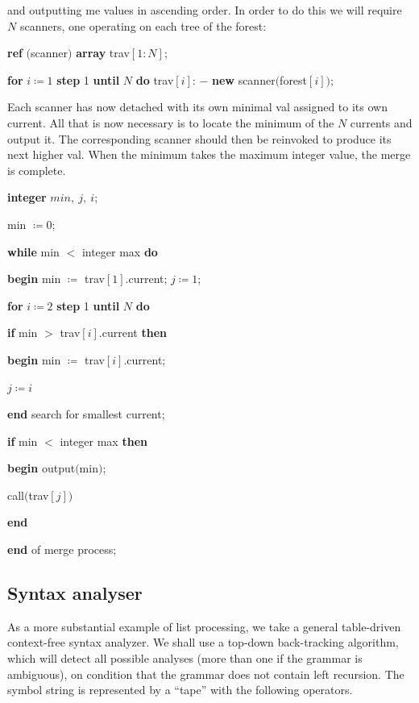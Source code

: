 \documentclass[twoside,11pt]{book}
\begin{document}
\noindent
and outputting me values in ascending order. In order to do this we will require $N$ scanners, one operating on each tree of the forest:

\quad \textbf{ref} $($scanner$)$ \textbf{array} trav$[1: N]$;

\quad \textbf{for} $i\coloneq 1$ \textbf{step} 1 \textbf{until} $N$ \textbf{do} trav$[i]$: $-$ \textbf{new} scanner$($forest$[i]);$

\noindent
Each scanner has now detached with its own minimal val assigned to its own current. All that is now necessary is to locate the minimum of the $N$ currents and output it. The corresponding scanner should then be reinvoked to produce its next higher val. When the minimum takes the maximum integer value, the merge is complete.

\quad \textbf{integer} $min,\ j,\ i$;

\quad min $\coloneq 0$;

\quad \textbf{while} min $<$ integer max \textbf{do}

\quad \quad \textbf{begin} min $\coloneq$ trav$[1]$.current; $j\coloneq 1$;

\quad \quad \quad \textbf{for} $i\coloneq 2$ \textbf{step} 1 \textbf{until} $N$ \textbf{do}

\quad \quad \quad \quad \textbf{if} min $>$ trav$[i]$.current \textbf{then}

\quad \quad \quad \quad \quad \textbf{begin} min $\coloneq$ trav$[i]$.current;

\quad \quad \quad \quad \quad \quad $j\coloneq i$

\quad \quad \quad \quad \quad \textbf{end} search for smallest current;

\quad \quad \quad \textbf{if} min $<$ integer max \textbf{then}

\quad \quad \quad \quad \textbf{begin} output$($min$)$;

\quad \quad \quad \quad \quad call$($trav$[j])$

\quad \quad \quad \quad \textbf{end}

\quad \quad \textbf{end} of merge process;

\subsection{Syntax analyser}

As a more substantial example of list processing, we take a general table-driven context-free syntax analyzer. We shall use a top-down back-tracking algorithm, which will detect all possible analyses (more than one if the grammar is ambiguous), on condition that the grammar does not contain left recursion. The symbol string is represented by a ``tape'' with the following operators.
\end{document}
